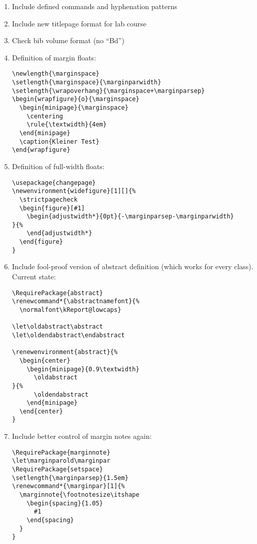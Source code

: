 \begin{enumerate}
\item Include defined commands and hyphenation patterns
\item Include new titlepage format for lab course
\item Check bib volume format (no \enquote{Bd})
\item Definition of margin floats:
\begin{verbatim}
\newlength{\marginspace}
\setlength{\marginspace}{\marginparwidth}
\setlength{\wrapoverhang}{\marginspace+\marginparsep}
\begin{wrapfigure}{o}{\marginspace}
  \begin{minipage}{\marginspace}
    \centering
    \rule{\textwidth}{4em}
  \end{minipage}
  \caption{Kleiner Test}
\end{wrapfigure}
\end{verbatim}
\item Definition of full-width floats:
\begin{verbatim}
\usepackage{changepage}
\newenvironment{widefigure}[1][]{%
  \strictpagecheck
  \begin{figure}[#1]
    \begin{adjustwidth*}{0pt}{-\marginparsep-\marginparwidth}
}{%
    \end{adjustwidth*}
  \end{figure}
}
\end{verbatim}
\item Include fool-proof version of abstract definition (which works for every class). Current state:
\begin{verbatim}
\RequirePackage{abstract}
\renewcommand*{\abstractnamefont}{%
  \normalfont\kReport@lowcaps}

\let\oldabstract\abstract
\let\oldendabstract\endabstract

\renewenvironment{abstract}{%
  \begin{center}
    \begin{minipage}{0.9\textwidth}
      \oldabstract
}{%
      \oldendabstract
    \end{minipage}
  \end{center}
}
\end{verbatim}

\item Include better control of margin notes again:
\begin{verbatim}
\RequirePackage{marginnote}
\let\marginparold\marginpar
\RequirePackage{setspace}
\setlength{\marginparsep}{1.5em}
\renewcommand*{\marginpar}[1]{%
  \marginnote{\footnotesize\itshape
    \begin{spacing}{1.05}
      #1
    \end{spacing}
  }
}
\end{verbatim}


\end{enumerate}
